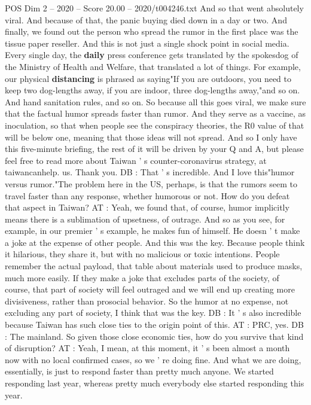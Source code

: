 \begin{textsample}{POS Dim 2 – 2020 – Score 20.00 – 2020/t004246.txt}
And so that went absolutely viral.
And because of that, the panic buying died down in a day or two.
And finally, we found out the person who spread the rumor in the first place was the tissue paper reseller.
And this is not just a single shock point in social media.
Every single day, the \textbf{daily} press conference gets translated by the spokesdog of the Ministry of Health and Welfare, that translated a lot of things.
For example, our physical \textbf{distancing} is phrased as saying"If you are outdoors, you need to keep two dog-lengths away, if you are indoor, three dog-lengths away,"and so on.
And hand sanitation rules, and so on.
So because all this goes viral, we make sure that the factual humor spreads faster than rumor.
And they serve as a vaccine, as inoculation, so that when people see the conspiracy theories, the R0 value of that will be below one, meaning that those ideas will not spread.
And so I only have this five-minute briefing, the rest of it will be driven by your Q and A, but please feel free to read more about Taiwan ' s counter-coronavirus strategy, at taiwancanhelp. us.
Thank you.
DB : That ' s incredible.
And I love this"humor versus rumor."The problem here in the US, perhaps, is that the rumors seem to travel faster than any response, whether humorous or not.
How do you defeat that aspect in Taiwan?
AT : Yeah, we found that, of course, humor implicitly means there is a sublimation of upsetness, of outrage.
And so as you see, for example, in our premier ' s example, he makes fun of himself.
He doesn ' t make a joke at the expense of other people.
And this was the key.
Because people think it hilarious, they share it, but with no malicious or toxic intentions.
People remember the actual payload, that table about materials used to produce masks, much more easily.
If they make a joke that excludes parts of the society, of course, that part of society will feel outraged and we will end up creating more divisiveness, rather than prosocial behavior.
So the humor at no expense, not excluding any part of society, I think that was the key.
DB : It ' s also incredible because Taiwan has such close ties to the origin point of this.
AT : PRC, yes.
DB : The mainland.
So given those close economic ties, how do you survive that kind of disruption?
AT : Yeah, I mean, at this moment, it ' s been almost a month now with no local confirmed cases, so we ' re doing fine.
And what we are doing, essentially, is just to respond faster than pretty much anyone.
We started responding last year, whereas pretty much everybody else started responding this year.

\end{textsample}
